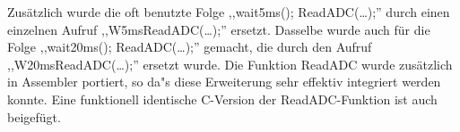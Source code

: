 Zus\"atzlich wurde die oft benutzte Folge ,,wait5ms(); ReadADC(\dots);'' durch einen einzelnen Aufruf
,,W5msReadADC(\dots);'' ersetzt.
Dasselbe wurde auch f\"ur die Folge ,,wait20ms(); ReadADC(\dots);'' gemacht, die durch den Aufruf
,,W20msReadADC(\dots);'' ersetzt wurde.
Die Funktion ReadADC wurde zus\"atzlich in Assembler portiert, so da"s diese Erweiterung
sehr effektiv integriert werden konnte.
Eine funktionell identische C-Version der ReadADC-Funktion ist auch beigef\"ugt.
